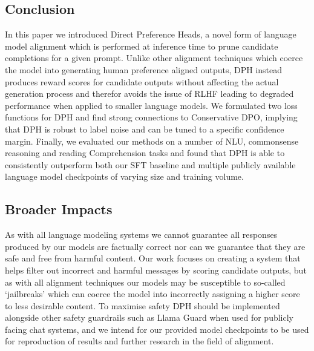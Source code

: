 \subsection{Conclusion}
In this paper we introduced Direct Preference Heads, a novel form of language model alignment which is performed at inference time to prune candidate completions for a given prompt. Unlike other alignment techniques which coerce the model into generating human preference aligned outputs, DPH instead produces reward scores for candidate outputs without affecting the actual generation process and therefor avoids the issue of RLHF leading to degraded performance when applied to smaller language models. We formulated two loss functions for DPH and find strong connections to Conservative DPO, implying that DPH is robust to label noise and can be tuned to a specific confidence margin. Finally, we evaluated our methods on a number of NLU, commonsense reasoning and reading Comprehension tasks and found that DPH is able to consistently outperform both our SFT baseline and multiple publicly available language model checkpoints of varying size and training volume.

\subsection*{Broader Impacts}
As with all language modeling systems we cannot guarantee all responses produced by our models are factually correct nor can we guarantee that they are safe and free from harmful content. Our work focuses on creating a system that helps filter out incorrect and harmful messages by scoring candidate outputs, but as with all alignment techniques our models may be susceptible to so-called `jailbreaks' which can coerce the model into incorrectly assigning a higher score to less desirable content. To maximise safety DPH should be implemented alongside other safety guardrails such as Llama Guard \cite{inan2023llama} when used for publicly facing chat systems, and we intend for our provided model checkpoints to be used for reproduction of results and further research in the field of alignment.